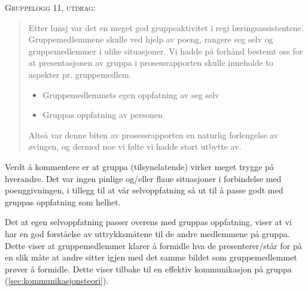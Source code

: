 \begin{centering}
\textsc{Gruppelogg 11, utdrag:}
\end{centering}
\begin{quote}
Etter lunsj var det en meget god gruppeaktivitet i regi læringsassistentene.
Gruppemedlemmene skulle ved hjelp av poeng, rangere seg selv og gruppemedlemmer
i ulike situasjoner. Vi hadde på forhånd bestemt oss for at presentasjonen av
gruppa i prosessrapporten skulle inneholde to aspekter pr. gruppemedlem.
\begin{itemize}
\item Gruppemedlemmets egen oppfatning av seg selv
\item Gruppas oppfatning av personen
\end{itemize}
Altså var denne biten av prosessrapporten en naturlig forlengelse av øvingen, og
dermed noe vi følte vi hadde stort utbytte av.
\end{quote}

Verdt å kommentere er at gruppa (tilsynelatende) virker meget trygge på hverandre.
Det var ingen pinlige og/eller flaue situasjoner i forbindelse med
poenggivningen, i tillegg til at vår selvoppfatning så ut til å passe godt med
gruppas oppfatning som helhet.

Det at egen selvoppfatning passer overens med gruppas oppfatning, viser at vi har en god
forståelse av uttrykksmåtene til de andre medlemmene på gruppa. Dette viser at gruppemedlemmer
klarer å formidle hva de presenterer/står for på en slik måte at andre sitter
igjen med det samme bildet som gruppemedlemmet prøver å formidle. Dette viser
tilbake til en effektiv kommunikasjon på gruppa (\ref{sec:kommunikasjonsteori}).


